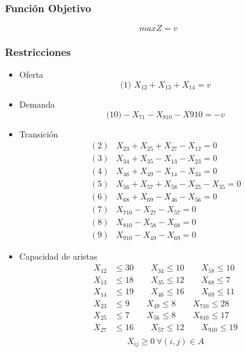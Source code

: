 \documentclass[a4paper,12pt]{article}
\begin{document}
\subsubsection{Función Objetivo}
\begin{equation*}
	maxZ = v
\end{equation*}

\subsubsection{Restricciones}
\begin{itemize}
	\item Oferta
		\begin{equation*}
		\text{(1) }	X_{12}+X_{13}+X_{14}=v	
		\end{equation*}
	\item Demanda
		\begin{equation*}
		\text{(10)}	-X_{71}-X_{810}-X{910}=-v
		\end{equation*}
	\item Transición
		\begin{equation*}
		\begin{split}
			(2)&X_{23}+X_{25}+X_{27}-X_{12}=0\\
			(3)&X_{34}+X_{35}-X_{13}-X_{23}=0\\
			(4)&X_{46}+X_{49}-X_{14}-X_{34}=0\\
			(5)&X_{56}+X_{57}+X_{58}-X_{25}-X_{35}=0\\
			(6)&X_{68}+X_{69}-X_{46}-X_{56}=0\\
			(7)&X_{710}-X_{27}-X_{57}=0\\
			(8)&X_{810}-X_{58}-X_{68}=0\\
			(9)&X_{910}-X_{49}-X_{69}=0
		\end{split}
		\end{equation*}
		\item Capacidad de aristas
		\begin{equation*}
		\begin{split}
			X_{12}&\leq 30 \qquad X_{34}\leq 10 \qquad X_{58}\leq 10\\
			X_{13}&\leq 18 \qquad X_{35}\leq 12 \qquad X_{68}\leq 7\\
			X_{14}&\leq 19 \qquad X_{46}\leq 16 \qquad X_{69}\leq 11\\
			X_{23}&\leq 9 \qquad X_{49}\leq 8 \qquad X_{710}\leq 28\\
			X_{25}&\leq 7 \qquad X_{56}\leq 8 \qquad X_{810}\leq 17\\
			X_{27}&\leq 16 \qquad X_{57}\leq 12 \qquad X_{910}\leq 19\\
		\end{split}
		\end{equation*}
		\begin{equation*}
			X_{ij}\geq 0\ \forall(i,j)\in A
		\end{equation*}
\end{itemize}
\end{document}
